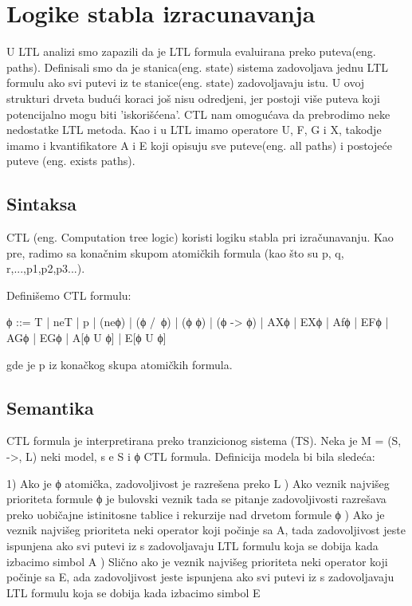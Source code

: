 \documentclass[a4paper]{article}
\begin{document}
	\section{Logike stabla izracunavanja}
	\label{sec:CTL}
	\newline
	U LTL analizi smo zapazili da je LTL formula evaluirana preko puteva(eng. paths). Definisali smo da je stanica(eng. state) sistema
	zadovoljava jednu LTL formulu ako svi putevi iz te stanice(eng. state) zadovoljavaju istu. U ovoj strukturi drveta budući koraci još nisu
	odredjeni, jer postoji više puteva koji potencijalno mogu biti 'iskorišćena'.
	CTL nam omogućava da prebrodimo neke nedostatke LTL metoda. Kao i u LTL imamo operatore U, F, G i X, takodje imamo i kvantifikatore
	A i E koji opisuju sve puteve(eng. all paths) i postojeće puteve (eng. exists paths). 
	\newline
	\newline
	\subsection{Sintaksa}
	\label{subsec:podnaslovN}
	\newline
	CTL (eng. Computation tree logic) koristi logiku stabla pri izračunavanju. 
	Kao pre, radimo sa konačnim skupom atomičkih formula (kao što su p, q, r,...,p1,p2,p3...).

	Definišemo CTL formulu:

	ϕ ::= T | neT | p | (neϕ) | (ϕ /\ ϕ) | (ϕ \/ ϕ) | (ϕ -> ϕ) | AXϕ | EXϕ | Afϕ | EFϕ | AGϕ | EGϕ | A[ϕ U ϕ] | E[ϕ U ϕ]

	gde je p iz konačkog skupa atomičkih formula.
	\newline
	
	\subsection{Semantika}
	\label{subsec:podnaslovN}
	\newline

	CTL formula je interpretirana preko tranzicionog sistema (TS). Neka je M = (S, ->, L) neki model, s e S i ϕ CTL formula.
	Definicija modela bi bila sledeća:

		1) Ako je ϕ atomička, zadovoljivost je razrešena preko L ) Ako veznik najvišeg prioriteta formule ϕ je bulovski veznik tada se pitanje zadovoljivosti razrešava
		   preko uobičajne istinitosne tablice i rekurzije nad drvetom formule ϕ ) Ako je veznik najvišeg prioriteta neki operator koji počinje sa A, tada zadovoljivost jeste ispunjena ako
		   svi putevi iz s zadovoljavaju LTL formulu koja se dobija kada izbacimo simbol A ) Slično ako je veznik najvišeg prioriteta neki operator koji počinje sa E, ada zadovoljivost jeste ispunjena ako
		   svi putevi iz s zadovoljavaju LTL formulu koja se dobija kada izbacimo simbol E \newline
\end{document}
